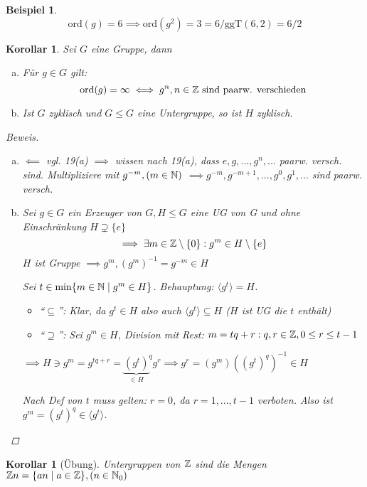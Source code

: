 \documentclass[a4paper]{article}
\theoremstyle{plain}
\newtheorem{kor}[thm]{Korollar}
\theoremstyle{definition}
\newtheorem*{bsp*}{Beispiel}
\begin{document}
\begin{bsp*}
$$\mathrm{ord}(g) = 6 \implies \mathrm{ord}(g^{2}) = 3 = 6/\mathrm{ggT}(6,2) = 6/2$$
\end{bsp*}

\begin{kor}
  Sei $G$ eine Gruppe, dann
  \begin{enumerate}[(a)]
    \item Für $g \in G$ gilt: $$\mathrm{ord}(g)= \infty \iff g^{n}, n \in \Bbb Z \text{ sind paarw. verschieden}$$
    \item Ist $G$ zyklisch und $G \le G$ eine Untergruppe, so ist $H$ zyklisch.
  \end{enumerate}
\begin{proof}[Beweis]
\item
  \begin{enumerate}[(a)]
\item $\impliedby$ vgl. 19(a)
$\implies$ wissen nach 19(a), dass $e, g, ..., g^{n}, ...$ paarw. versch. sind. Multipliziere mit $g^{-m},(m \in \Bbb N)$
$\implies g^{-m}, g^{-m+1}, ..., g^{0}, g^{1}, ...$ sind paarw. versch.
\item Sei $g \in G$ ein Erzeuger von $G, H \le G$ eine UG von G und ohne Einschränkung $H \supsetneq \{e\}$
$$\implies \exists m \in \Bbb Z \setminus \{0\}:g^{m} \in H \setminus \{e\}$$
$H$ ist Gruppe $\implies g^{m}, (g^{m})^{-1} = g^{-m} \in H$

Sei $t \in \min\{m \in \Bbb N \mid g^{m} \in H\}$. Behauptung: $\langle g^{t} \rangle = H$.
\begin{itemize}
\item ``$\subseteq$'': Klar, da $g^{t} \in H$ also auch $\langle g^{t} \rangle \subseteq H$ ($H$ ist UG die $t$ enthält)
\item ``$\supseteq$'': Sei $g^{m} \in H$, Division mit Rest: $m = tq + r:  q, r \in \Bbb Z, 0 \leq r \leq t-1$
\end{itemize}
$\implies H \ni g^{m} = g^{tq + r} = {\underbrace{(g^{t})}_{\in H}}^{q}g^{r} \implies g^{r} = (g^{m})((g^{t})^{q})^{-1} \in H$

          Nach Def von $t$ muss gelten: $r = 0$, da $r = 1, ..., t-1$ verboten.
Also ist $g^{m} = (g^{t})^{q} \in \langle g^{t} \rangle$.
  \end{enumerate}

\end{proof}


\end{kor}
\begin{kor}[Übung]
Untergruppen von $\Bbb Z$ sind die Mengen $\Bbb Zn = \{an \mid a \in \Bbb Z\}, (n \in \Bbb N_{0})$
\end{kor}
\end{document}
